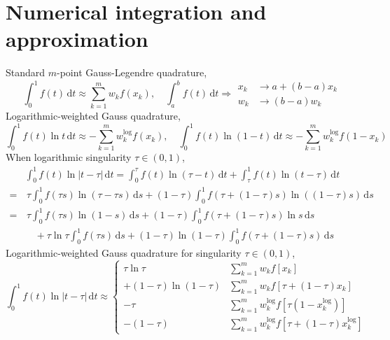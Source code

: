 \documentclass{jfm}
\begin{document}
\section{Numerical integration and approximation}
Standard $m$-point Gauss-Legendre quadrature,
\begin{equation}
\int_0^1 f(t)\,\mathrm{d}t\approx \sum_{k=1}^{m}w_k f(x_k),\quad
\int_a^b f(t)\,\mathrm{d}t\Rightarrow
\begin{aligned}
x_k&\to a+(b-a)x_k\\ w_k&\to (b-a)w_k
\end{aligned}
\end{equation}
Logarithmic-weighted Gauss quadrature,
\begin{equation}
\int_0^1 f(t) \ln t \,\mathrm{d}t\approx -\sum_{k=1}^{m}w_k^\mathrm{log} f(x_k),\quad
\int_0^1 f(t) \ln (1-t) \,\mathrm{d}t\approx -\sum_{k=1}^{m}w_k^\mathrm{log} f(1-x_k)
\end{equation}
When logarithmic singularity $\tau\in (0,1)$,
\begin{align*}
&\int_0^1 f(t) \ln |t-\tau|\,\mathrm{d}t 
=\int_0^\tau f(t) \ln (\tau - t)\,\mathrm{d}t+\int_\tau^1 f(t) \ln (t-\tau)\,\mathrm{d}t\\
=&\,\tau\int_0^1 f(\tau s) \ln (\tau - \tau s)\,\mathrm{d}s
+(1-\tau) \int_0^1 f(\tau + (1-\tau) s) \ln ( (1-\tau) s)\,\mathrm{d}s\\
=&\,\tau\int_0^1 f(\tau s) \ln (1 - s)\,\mathrm{d} s
+(1-\tau) \int_0^1 f(\tau + (1-\tau) s) \ln s\,\mathrm{d}s\\
&\quad+\tau\ln\tau\int_0^1 f(\tau s) \,\mathrm{d} s
+(1-\tau)\ln (1-\tau) \int_0^1 f(\tau + (1-\tau) s) \,\mathrm{d}s
\end{align*}
Logarithmic-weighted Gauss quadrature for singularity $\tau\in (0,1)$,
\begin{equation}\int_0^1 f(t) \ln |t-\tau|\,\mathrm{d}t 
\approx\left\{ 
\begin{aligned}
\tau\ln\tau &\sum_{k=1}^m w_k f\left[x_k\right] \\
+ (1- \tau)\ln(1-\tau) &\sum_{k=1}^m w_k f\left[\tau + (1-\tau)x_k\right]\\
- \tau &\sum_{k=1}^m w_k^\mathrm{log} f\left[\tau(1 -x_k^\mathrm{log})\right]\\
- (1- \tau) &\sum_{k=1}^m w_k^\mathrm{log} f\left[\tau + (1-\tau)x_k^\mathrm{log}\right]
\end{aligned}\right.
\end{equation}
\end{document}
